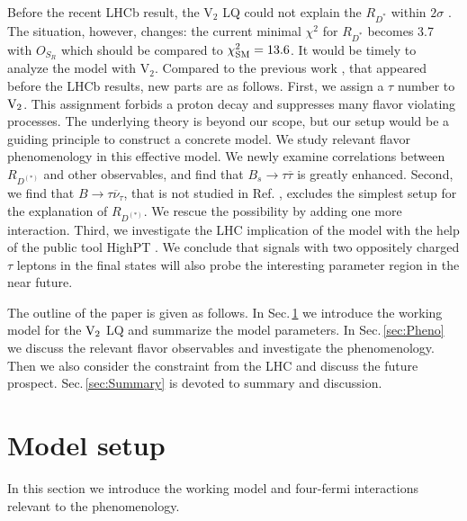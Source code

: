 \documentclass[12pt, a4paper]{article}
\numberwithin{equation}{section} %
\newcommand{\ov}{\overline}
\newcommand{\1}{\mbox{1}\hspace{-0.25em}\mbox{l}}
\begin{document}
Before the recent LHCb result, the $\text{V}_2$ LQ could not explain the $R_{D^{*}}$ within $2\sigma$ \cite{Iguro:2018vqb}.
The situation, however, changes: the current minimal $\chi^2$ for $R_{D^{*}}$ becomes 3.7 with $O_{S_R}$ \cite{Iguro:2022yzr} which should be compared to $\chi^2_{\rm{SM}}=13.6$.
It would be timely to analyze the model with $\text{V}_2$.
Compared to the previous work \cite{Cheung:2022zsb}, that appeared before the LHCb results, new parts are as follows. 
First, we assign a $\tau$ number to $\rm{V}_2$. 
This assignment forbids a proton decay and suppresses many flavor violating processes. 
The underlying theory is beyond our scope, but our setup would be a guiding principle to construct a concrete model. We study relevant flavor phenomenology in this effective model.
We newly examine correlations between $R_{D^{(*)}}$ and other observables, and find that $B_s\to\tau\ov\tau$ is greatly enhanced.
Second, we find that $B\to\tau\ov\nu_\tau$, that is not studied in Ref. \cite{Cheung:2022zsb}, excludes the simplest setup for the explanation of $R_{D^{(*)}}$.
We rescue the possibility by adding one more interaction.
Third, we investigate the LHC implication of the model with the help of the public tool HighPT \cite{Allwicher:2022mcg}.
We conclude that signals with two oppositely charged $\tau$ leptons in the final states will also probe the interesting parameter region in the near future.


The outline of the paper is given as follows.
In Sec.\,\ref{sec:Model} we introduce the working model for the $\rm{V}_2$ LQ and summarize the model parameters.
In Sec.\,\ref{sec:Pheno} we discuss the relevant flavor observables and investigate the phenomenology.
Then we also consider the constraint from the LHC and discuss the future prospect.
Sec.\,\ref{sec:Summary} is devoted to summary and discussion.


\section{Model setup}
\label{sec:Model}
In this section we introduce the working model and four-fermi interactions relevant to the phenomenology.

\end{document}
